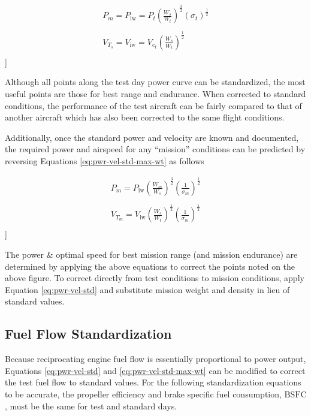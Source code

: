 \documentclass[
]{book}
\begin{document}
\begin{align}
P_m = P_{\text{iw}} = P_t \left( \frac{W_s}{W_t} \right)^{\frac{3}{2}} \left( \sigma_t \right)^{\frac{1}{2}}  \\
\\
V_{T_s} = V_{\text{iw}}= V_{e_t} \left( \frac{W_s}{W_t} \right)^{\frac{1}{2}} \\
\end{align}
\label{eq:pwr-vel-std-max-wt}
{]}

Although all points along the test day power curve can be standardized, the most
useful points are those for best range and endurance. When corrected to standard
conditions, the performance of the test aircraft can be fairly compared to that
of another aircraft which has also been corrected to the same flight conditions.

Additionally, once the standard power and velocity are known and documented, the
required power and airspeed for any ``mission'' conditions can be predicted by
reversing Equations \eqref{eq:pwr-vel-std-max-wt} as follows

\begin{align}
P_m = P_{\text{iw}} \left( \frac{W_m}{W_s} \right)^{\frac{3}{2}} \left( \frac{1}{\sigma_m} \right)^{\frac{1}{2}} \\
\\
V_{T_m} = V_{\text{iw}} \left( \frac{W_s}{W_t} \right)^{\frac{1}{2}} \left( \frac{1}{\sigma_m} \right)^{\frac{1}{2}}\\
\end{align}
\label{eq:pwr-vel-msn}
{]}

The power \& optimal speed for best mission range (and mission endurance) are
determined by applying the above equations to correct the points noted on the
above figure. To correct directly from test conditions to mission conditions,
apply Equation \eqref{eq:pwr-vel-std} and substitute mission weight and density
in lieu of standard values.

\hypertarget{fuel-flow-standardization}{%
\subsection{Fuel Flow Standardization}\label{fuel-flow-standardization}}

Because reciprocating engine fuel flow is essentially proportional to power
output, Equations \eqref{eq:pwr-vel-std} and \eqref{eq:pwr-vel-std-max-wt} can
be modified to correct the test fuel flow to standard values. For the following
standardization equations to be accurate, the propeller efficiency and brake
specific fuel consumption, \(\mathrm{BSFC}\), must be the same for test and
standard days.
\end{document}
